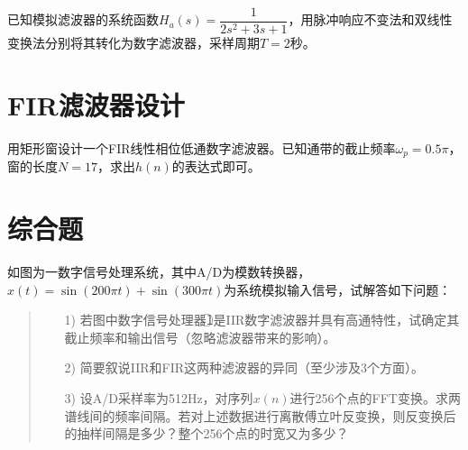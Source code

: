 \documentclass[cn, hazy, blue, normal, 14pt]{elegantnote}
\begin{document}
\begin{exercise}

已知模拟滤波器的系统函数$H_a(s)=\dfrac{1}{2s^2+3s+1}$，用脉冲响应不变法和双线性变换法分别将其转化为数字滤波器，采样周期$T=2$秒。

\end{exercise}

\begin{solution}[print=false]
    


\end{solution}


\section{FIR滤波器设计}

\begin{exercise}

用矩形窗设计一个FIR线性相位低通数字滤波器。已知通带的截止频率$\omega_p=0.5\pi$，窗的长度$N=17$，求出$h(n)$的表达式即可。

\end{exercise}

\begin{solution}[print=false]



\end{solution}


\section{综合题}

\begin{exercise}

如图为一数字信号处理系统，其中A/D为模数转换器，$x(t)=\sin(200\pi t)+\sin(300\pi t)$为系统模拟输入信号，试解答如下问题：

\begin{center}
\end{center}

\begin{quote}
\begin{itemize}
    \item[1)] 若图中数字信号处理器\textcircled{1}是IIR数字滤波器并具有高通特性，试确定其截止频率和输出信号（忽略滤波器带来的影响）。
    \item[2)] 简要叙说IIR和FIR这两种滤波器的异同（至少涉及3个方面）。
    \item[3)] 设A/D采样率为512Hz，对序列$x(n)$进行256个点的FFT变换。求两谱线间的频率间隔。若对上述数据进行离散傅立叶反变换，则反变换后的抽样间隔是多少？整个256个点的时宽又为多少？
\end{itemize}
\end{quote}

\end{exercise}

\begin{solution}[print=false]



\end{solution}
\end{document}
